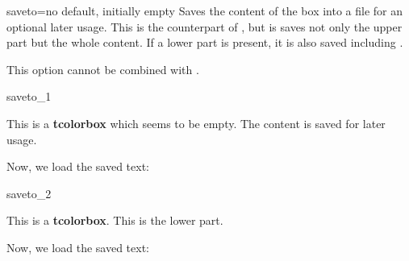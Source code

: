 \clearpage
\begin{docTcbKey}[][doc new=2015-05-04]{saveto}{=}{no default, initially empty}
  Saves the content of the box into a file for an optional later usage.
  This is the counterpart of , but is saves not
  only the upper part but the whole content. If a lower part is present,
  it is also saved including .
  \begin{marker}
  This option cannot be combined with .
  \end{marker}

\begin{exdispExample}{saveto_1}
\begin{tcolorbox}[invisible,saveto=\jobname_mysave1.tex,colback=white]
This is a \textbf{tcolorbox} which seems to be empty.
The content is saved for later usage.
\end{tcolorbox}

Now, we load the saved text:\\

\end{exdispExample}

\begin{exdispExample}{saveto_2}
\begin{tcolorbox}[saveto=\jobname_mysave2.tex]
This is a \textbf{tcolorbox}.
\tcblower
This is the lower part.
\end{tcolorbox}

Now, we load the saved text:
\begin{tcolorbox}[colframe=red,colback=red!10,
  coltitle=black,colbacktitle=red!20,sidebyside,
  title=Here we see the saved content including the lower part]

\end{tcolorbox}
\end{exdispExample}
\end{docTcbKey}



\clearpage
